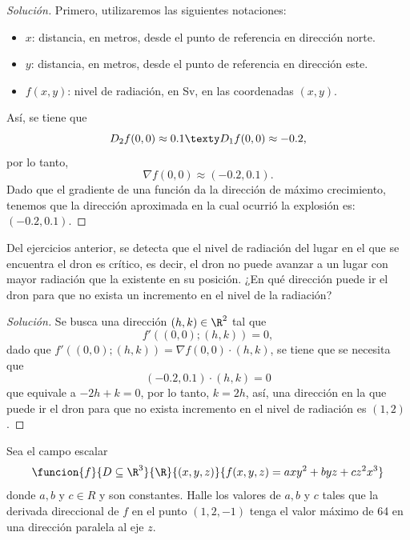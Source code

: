 \documentclass[a4,11pt]{aleph-notas}
\begin{document}
\begin{proof}[Solución]
Primero, utilizaremos las siguientes notaciones:
    \begin{itemize}
        \item $x$: distancia, en metros, desde el punto de referencia en dirección norte.
        \item $y$: distancia, en metros, desde el punto de referencia en dirección este.
        \item $f(x,y)$: nivel de radiación, en Sv, en las coordenadas $(x,y)$.
    \end{itemize}
    Así, se tiene que 
    \[
        D_2f(0,0)\approx 0.1
        \texty
        D_1f(0,0)\approx -0.2,
    \]
    por lo tanto,
    \[
        \nabla f(0,0)\approx (-0.2,0.1).
    \]
    Dado que el gradiente de una función da la dirección de máximo crecimiento, tenemos que la dirección aproximada en la cual ocurrió la explosión es: $(-0.2,0.1)$.
\end{proof}

\begin{ejer}
Del ejercicios anterior, se detecta que el nivel de radiación del lugar en el que se encuentra el dron es crítico, es decir, el dron no puede avanzar a un lugar con mayor radiación que la existente en su posición. ¿En qué dirección puede ir el dron para que no exista un incremento en el nivel de la radiación?
\end{ejer}

\begin{proof}[Solución]
Se busca una dirección $(h,k)\in\R^2$ tal que
    \[
        f'((0,0);(h,k))=0,
    \]
    dado que $f'((0,0);(h,k))=\nabla f(0,0)\cdot (h,k)$, se tiene que se necesita que
    \[
        (-0.2,0.1)\cdot (h,k) = 0
    \]
    que equivale a $-2h+k=0$, por lo tanto, $k=2h$, así, una dirección en la que puede ir el dron para que no exista incremento en el nivel de radiación es $(1,2)$.
\end{proof}

\begin{ejer}
Sea el campo escalar
    \[
        \funcion{f}{D\subseteq\R^3}{\R}{(x,y,z)}{f{(x,y,z)=axy^2+byz+cz^2x^3}}
    \]
    donde $a,b$ y $c\in R$ y son constantes. Halle los valores de $a,b$ y $c$ tales que la derivada direccional de $f$ en el punto $(1,2,-1)$ tenga el valor máximo de 64 en una dirección paralela al eje $z$.
\end{ejer}
\end{document}
